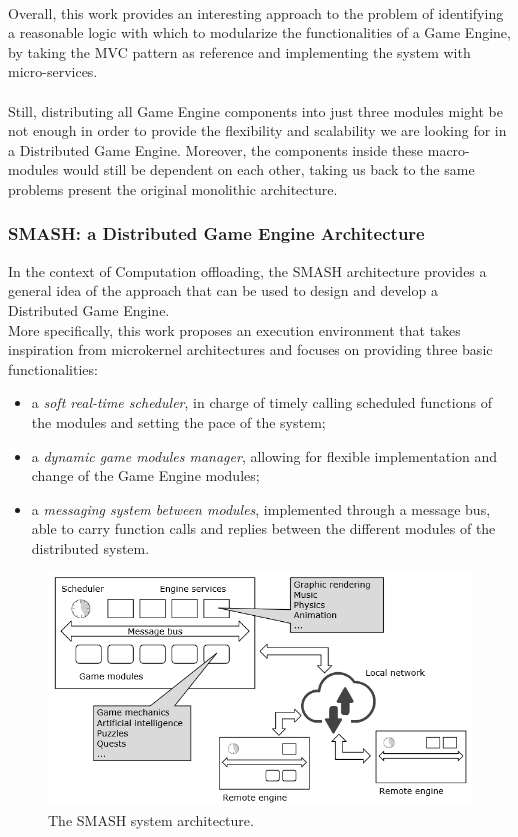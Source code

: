 \\ Overall, this work provides an interesting approach to the problem of identifying a reasonable logic with which to modularize the functionalities of a Game Engine, by taking the MVC pattern as reference and implementing the system with micro-services. \\ \\
Still, distributing all Game Engine components into just three modules might be not enough in order to provide the flexibility and scalability we are looking for in a Distributed Game Engine. Moreover, the components inside these macro-modules would still be dependent on each other, taking us back to the same problems present the original monolithic architecture.

\subsubsection{SMASH: a Distributed Game Engine Architecture}
In the context of Computation offloading, the SMASH architecture provides a general idea of the approach that can be used to design and develop a Distributed Game Engine. \\
More specifically, this work proposes an execution environment that takes inspiration from microkernel architectures and focuses on providing three basic functionalities:
\begin{itemize}
	\item a \textit{soft real-time scheduler}, in charge of timely calling scheduled functions of the modules and setting the pace of the system;
	\item a \textit{dynamic game modules manager}, allowing for flexible implementation and change of the Game Engine modules;
	\item a \textit{messaging system between modules}, implemented through a message bus, able to carry function calls and replies between the different modules of the distributed system.
\end{itemize}
\begin{figure}[h!]
	\centering
	\includegraphics[width=0.9\linewidth]{"immagini/State-of-the-art/SMASH architecture"}
	\caption[The SMASH system architecture.]{The SMASH system architecture.}
	\label{fig:smash-architecture}
\end{figure}
